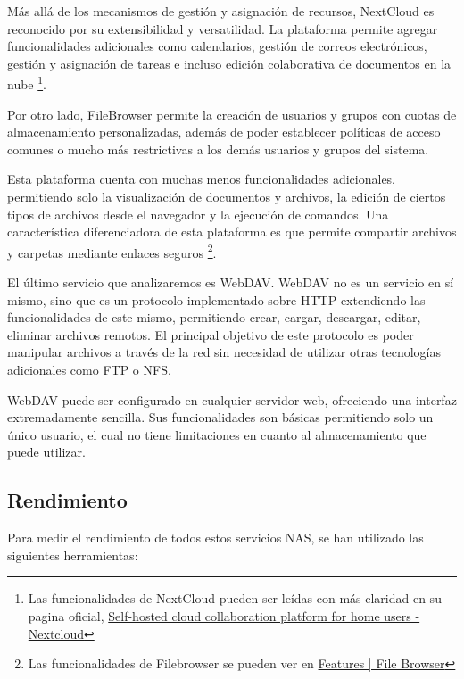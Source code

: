 \documentclass[a4paper,10pt]{article}
\begin{document}
	Más allá de los mecanismos de gestión y asignación de recursos, NextCloud es reconocido por su extensibilidad y versatilidad. La plataforma permite agregar funcionalidades adicionales como calendarios, gestión de correos electrónicos, gestión y asignación de tareas e incluso edición colaborativa de documentos en la nube \footnote{Las funcionalidades de NextCloud pueden ser leídas con más claridad en su pagina oficial, \href{https://nextcloud.com/es/athome/}{Self-hosted cloud collaboration platform for home users - Nextcloud}}.
	
	Por otro lado, FileBrowser permite la creación de usuarios y grupos con cuotas de almacenamiento personalizadas, además de poder establecer políticas de acceso comunes o mucho más restrictivas a los demás usuarios y grupos del sistema.

	Esta plataforma cuenta con muchas menos funcionalidades adicionales, permitiendo solo la visualización de documentos y archivos, la edición de ciertos tipos de archivos desde el navegador y la ejecución de comandos. Una característica diferenciadora de esta plataforma es que permite compartir archivos y carpetas mediante enlaces seguros \footnote{Las funcionalidades de Filebrowser se pueden ver en \href{https://filebrowser.org/features}{Features | File Browser}}.
	
	El último servicio que analizaremos es WebDAV. WebDAV no es un servicio en sí mismo, sino que es un protocolo implementado sobre HTTP extendiendo las funcionalidades de este mismo, permitiendo crear, cargar, descargar, editar, eliminar archivos remotos. El principal objetivo de este protocolo es poder manipular archivos a través de la red sin necesidad de utilizar otras tecnologías adicionales como FTP o NFS.

	WebDAV puede ser configurado en cualquier servidor web, ofreciendo una interfaz extremadamente sencilla. Sus funcionalidades son básicas permitiendo solo un único usuario, el cual no tiene limitaciones en cuanto al almacenamiento que puede utilizar.

	\subsection{Rendimiento}
	Para medir el rendimiento de todos estos servicios NAS, se han utilizado las siguientes herramientas:
	
\end{document}
